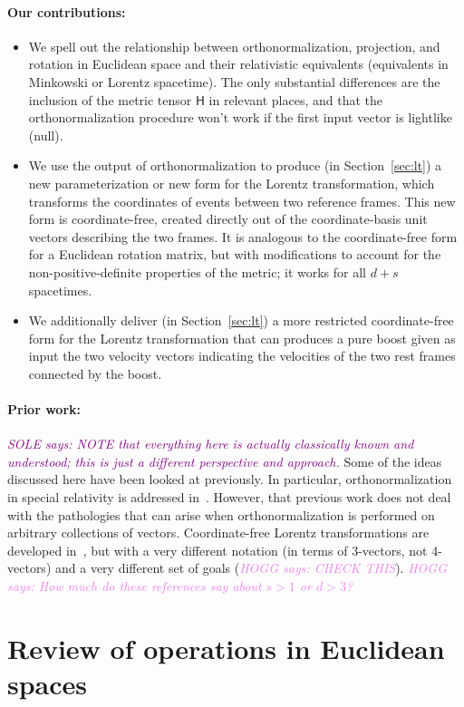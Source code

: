 \documentclass{article}
\newcommand{\metric}{\mathsf{H}}
\newcommand{\plus}{\!+\!} %
\newcommand{\secref}[1]{Section~\ref{#1}}
\newcommand{\SOLE}[1]{\textcolor{purple}{\textsl{SOLE says: {#1}}}}
\newcommand{\HOGG}[1]{\textcolor{violet}{\textsl{HOGG says: {#1}}}}
\begin{document}
\paragraph{Our contributions:}
\begin{itemize}
\item
We spell out the relationship between orthonormalization, projection, and rotation in Euclidean space and their relativistic equivalents (equivalents in Minkowski or Lorentz spacetime).
The only substantial differences are the inclusion of the metric tensor $\metric$ in relevant places, and that the orthonormalization procedure won't work if the first input vector is lightlike (null).
\item
We use the output of orthonormalization to produce (in \secref{sec:lt}) a new parameterization or new form for the Lorentz transformation, which transforms the coordinates of events between two reference frames.
This new form is coordinate-free, created directly out of the coordinate-basis unit vectors describing the two frames.
It is analogous to the coordinate-free form for a Euclidean rotation matrix, but with modifications to account for the non-positive-definite properties of the metric; it works for all $d\plus s$ spacetimes.
\item
We additionally deliver (in \secref{sec:lt}) a more restricted coordinate-free form for the Lorentz transformation that can produces a pure boost given as input the two velocity vectors indicating the velocities of the two rest frames connected by the boost.
\end{itemize}

\paragraph{Prior work:}
\SOLE{NOTE that everything here is actually classically known and understood; this is just a different perspective and approach.}
Some of the ideas discussed here have been looked at previously.
In particular, orthonormalization in special relativity is addressed in~\cite{joot}.
However, that previous work does not deal with the pathologies that can arise when orthonormalization is performed on arbitrary collections of vectors.
Coordinate-free Lorentz transformations are developed in~\cite{wagner}, but with a very different notation (in terms of 3-vectors, not 4-vectors) and a very different set of goals (\HOGG{CHECK THIS}).
\HOGG{How much do these references say about $s>1$ or $d>3$?}

\section{Review of operations in Euclidean spaces}\label{sec:od}
\end{document}
